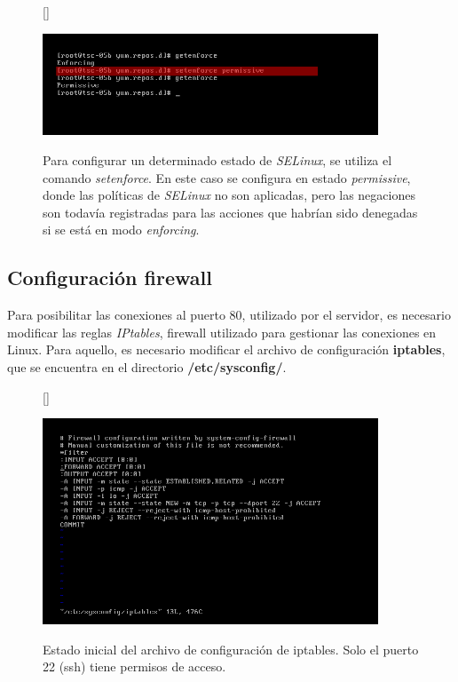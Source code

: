 \documentclass[11pt]{article}
\begin{document}
\begin{figure}[ht]
[\FBwidth]
{\caption{Para configurar un determinado estado de \textit{SELinux}, se utiliza el comando \textit{setenforce}. En este caso se configura en estado \textit{permissive}, donde las políticas de \textit{SELinux} no son aplicadas, pero las negaciones son todavía registradas para las acciones que habrían sido denegadas si se está en modo \textit{enforcing}.}\label{fig:setPermissive}}
{\includegraphics[width=10cm]{screenshots/permissions/set-permissive.png}}
\end{figure}


\subsection{Configuración firewall}
Para posibilitar las conexiones al puerto 80, utilizado por el servidor, es necesario modificar las reglas \textit{IPtables}, firewall utilizado para gestionar las conexiones en Linux. Para aquello, es necesario modificar el archivo de configuración \textbf{iptables}, que se encuentra en el directorio \textbf{/etc/sysconfig/}. 

\begin{figure}[ht]
[\FBwidth]
{\caption{Estado inicial del archivo de configuración de iptables. Solo el puerto 22 (ssh) tiene permisos de acceso.}\label{fig:iptablesBefore}}
{\includegraphics[width=10cm]{screenshots/iptables-config/vi-iptables-before.png}}
\end{figure}
\end{document}
